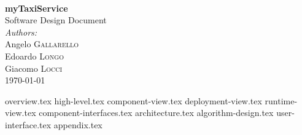 \documentclass[12pt, a4paper]{article}
\begin{document}
\begin{titlepage}
 


\HRule \\[0.4cm]
{ \huge \bfseries myTaxiService} \\[0.2cm]%
	{\Large Software Design Document}
\HRule \\[1.5cm]
 


\large \emph{Authors:}\\
Angelo  \textsc{Gallarello}\\
Edoardo  \textsc{Longo}\\
Giacomo  \textsc{Locci}\\[1.5cm]


{\large \today} %



\vfill %

\end{titlepage}

\newpage

\tableofcontents

\newpage

{overview.tex}
\newpage
{high-level.tex}
\newpage
{component-view.tex}
\newpage
{deployment-view.tex}
\newpage
{runtime-view.tex}
\newpage
{component-interfaces.tex}
\newpage
{architecture.tex}
\newpage
{algorithm-design.tex}
\newpage
{user-interface.tex}
{appendix.tex}
\end{document}
